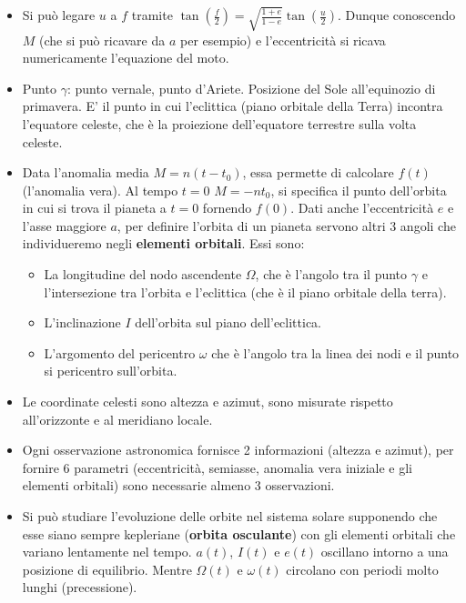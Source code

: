 \documentclass[11pt,a4paper]{article}
\begin{document}
\begin{itemize}
\item Si può legare $u$ a $f$ tramite $\tan \left( \frac{f}{2} \right) = \sqrt{\frac{1+e}{1-e}} \tan \left( \frac{u}{2} \right)$. Dunque conoscendo $M$ (che si può ricavare da $a$ per esempio) e l'eccentricità si ricava numericamente l'equazione del moto.

\item Punto $\gamma$: punto vernale, punto d'Ariete. Posizione del Sole all'equinozio di primavera. E' il punto in cui l'eclittica (piano orbitale della Terra) incontra l'equatore celeste, che è la proiezione dell'equatore terrestre sulla volta celeste.

\item Data l'anomalia media $M = n(t-t_0)$, essa permette di calcolare $f(t)$ (l'anomalia vera). Al tempo $t = 0$ $M = -n t_0$, si specifica il punto dell'orbita in cui si trova il pianeta a $t = 0$ fornendo $f(0)$. Dati anche l'eccentricità $e$ e l'asse maggiore $a$, per definire l'orbita di un pianeta servono altri $3$ angoli che individueremo negli \textbf{elementi orbitali}. Essi sono:
\begin{itemize}
\item La longitudine del nodo ascendente $\Omega$, che è l'angolo tra il punto $\gamma$ e l'intersezione tra l'orbita e l'eclittica (che è il piano orbitale della terra).
\item L'inclinazione $I$ dell'orbita sul piano dell'eclittica.
\item L'argomento del pericentro $\omega$ che è l'angolo tra la linea dei nodi e il punto si pericentro sull'orbita.
\end{itemize}

\item Le coordinate celesti sono altezza e azimut, sono misurate rispetto all'orizzonte e al meridiano locale.

\item Ogni osservazione astronomica fornisce 2 informazioni (altezza e azimut), per fornire 6 parametri (eccentricità, semiasse, anomalia vera iniziale e gli elementi orbitali) sono necessarie almeno 3 osservazioni.

\item Si può studiare l'evoluzione delle orbite nel sistema solare supponendo che esse siano sempre kepleriane (\textbf{orbita osculante}) con gli elementi orbitali che variano lentamente nel tempo. $a(t)$, $I(t)$ e $e(t)$ oscillano intorno a una posizione di equilibrio. Mentre $\Omega(t)$ e $\omega(t)$ circolano con periodi molto lunghi (precessione).


\end{itemize}
\end{document}
